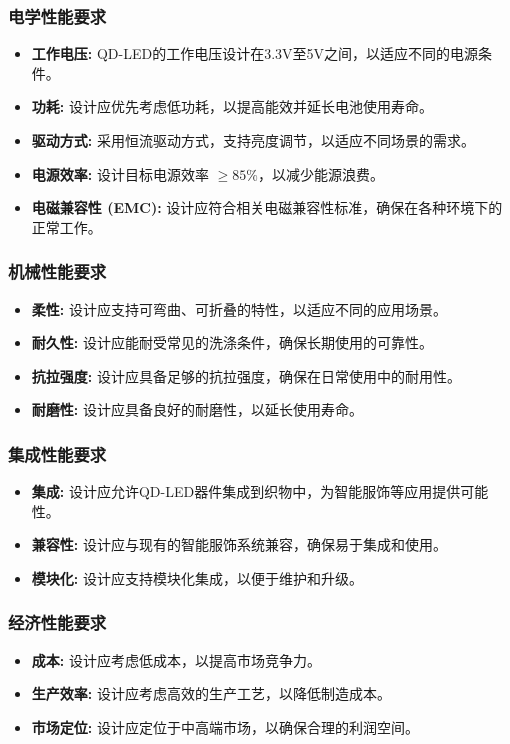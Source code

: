 \documentclass[12pt,hyperref,a4paper,UTF8]{ctexart}
\begin{document}
\subsubsection*{电学性能要求}
\begin{itemize}
  \item \textbf{工作电压:} QD-LED的工作电压设计在3.3V至5V之间，以适应不同的电源条件。
  \item \textbf{功耗:} 设计应优先考虑低功耗，以提高能效并延长电池使用寿命。
  \item \textbf{驱动方式:} 采用恒流驱动方式，支持亮度调节，以适应不同场景的需求。
  \item \textbf{电源效率:} 设计目标电源效率 $\geq 85\%$，以减少能源浪费。
  \item \textbf{电磁兼容性 (EMC):} 设计应符合相关电磁兼容性标准，确保在各种环境下的正常工作。
\end{itemize}

\subsubsection*{机械性能要求}
\begin{itemize}
  \item \textbf{柔性:} 设计应支持可弯曲、可折叠的特性，以适应不同的应用场景。
  \item \textbf{耐久性:} 设计应能耐受常见的洗涤条件，确保长期使用的可靠性。
  \item \textbf{抗拉强度:} 设计应具备足够的抗拉强度，确保在日常使用中的耐用性。
  \item \textbf{耐磨性:} 设计应具备良好的耐磨性，以延长使用寿命。
\end{itemize}

\subsubsection*{集成性能要求}
\begin{itemize}
  \item \textbf{集成:} 设计应允许QD-LED器件集成到织物中，为智能服饰等应用提供可能性。
  \item \textbf{兼容性:} 设计应与现有的智能服饰系统兼容，确保易于集成和使用。
  \item \textbf{模块化:} 设计应支持模块化集成，以便于维护和升级。
\end{itemize}

\subsubsection*{经济性能要求}
\begin{itemize}
  \item \textbf{成本:} 设计应考虑低成本，以提高市场竞争力。
  \item \textbf{生产效率:} 设计应考虑高效的生产工艺，以降低制造成本。
  \item \textbf{市场定位:} 设计应定位于中高端市场，以确保合理的利润空间。
\end{itemize}
\end{document}
